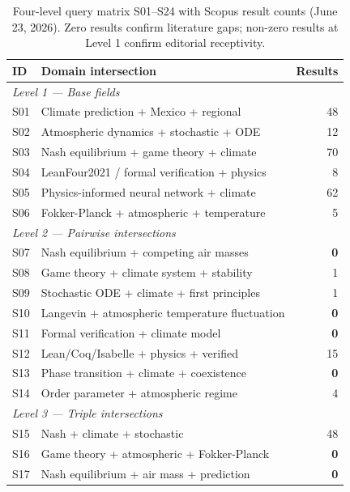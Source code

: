 \documentclass[gmd, manuscript]{copernicus}
\begin{document}
\begin{table}[ht]
\centering
\caption{Four-level query matrix S01--S24 with Scopus result counts
(June 23, 2026). Zero results confirm literature gaps; non-zero results
at Level 1 confirm editorial receptivity.}
\label{tab:queries}
\small
\begin{tabular}{llr}
\hline
\textbf{ID} & \textbf{Domain intersection} & \textbf{Results} \\
\hline
\multicolumn{3}{l}{\textit{Level 1 — Base fields}} \\
S01 & Climate prediction + Mexico + regional          &  48 \\
S02 & Atmospheric dynamics + stochastic + ODE         &  12 \\
S03 & Nash equilibrium + game theory + climate        &  70 \\
S04 & LeanFour2021 / formal verification + physics           &   8 \\
S05 & Physics-informed neural network + climate       &  62 \\
S06 & Fokker-Planck + atmospheric + temperature       &   5 \\
\hline
\multicolumn{3}{l}{\textit{Level 2 — Pairwise intersections}} \\
S07 & Nash equilibrium + competing air masses         &   \textbf{0} \\
S08 & Game theory + climate system + stability        &   1 \\
S09 & Stochastic ODE + climate + first principles     &   1 \\
S10 & Langevin + atmospheric temperature fluctuation  &   \textbf{0} \\
S11 & Formal verification + climate model             &   \textbf{0} \\
S12 & Lean/Coq/Isabelle + physics + verified          &  15 \\
S13 & Phase transition + climate + coexistence        &   \textbf{0} \\
S14 & Order parameter + atmospheric regime            &   4 \\
\hline
\multicolumn{3}{l}{\textit{Level 3 — Triple intersections}} \\
S15 & Nash + climate + stochastic                     &  48 \\
S16 & Game theory + atmospheric + Fokker-Planck       &   \textbf{0} \\
S17 & Nash equilibrium + air mass + prediction        &   \textbf{0} \\

\end{tabular}
\end{table}
\end{document}
